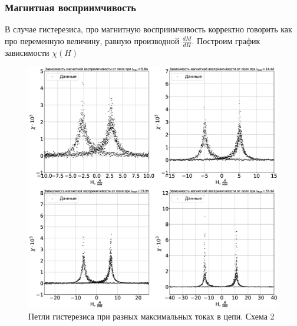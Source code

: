 \documentclass[a4paper,14pt]{extarticle}
\begin{document}
			\subsubsection{Магнитная восприимчивость}
				В случае гистерезиса, про магнитную восприимчивость корректно говорить как про переменную величину, равную производной $\frac{dM}{dH}$. Построим график зависимости $\chi(H)$
				\begin{figure}[h]
					\centering
					\includegraphics[width=1.0\linewidth]{Lab2_5.eps}
					\caption{Петли гистерезиса при разных максимальных токах в цепи. Схема 2}
					\label{fig8}
				\end{figure}
\end{document}
